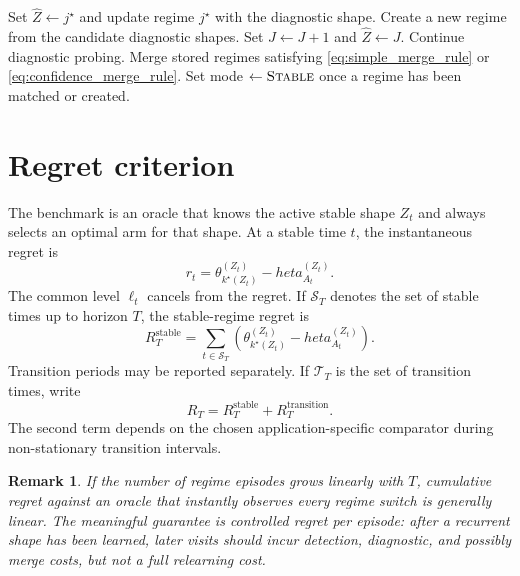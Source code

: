 \documentclass[11pt]{article}
\newtheorem{remark}{Remark}
\newcommand{\Sset}{\mathcal S}
\newcommand{\Tset}{\mathcal T}
\begin{document}
\begin{algorithm}[t]
\begin{algorithmic}[1]
            \State Set $\widehat Z\gets j^\star$ and update regime $j^\star$ with the diagnostic shape.
            \State Create a new regime from the candidate diagnostic shapes.
            \State Set $J\gets J+1$ and $\widehat Z\gets J$.
        \Else
            \State Continue diagnostic probing.
        \EndIf
        \State Merge stored regimes satisfying \eqref{eq:simple_merge_rule} or \eqref{eq:confidence_merge_rule}.
        \State Set mode $\gets\textsc{Stable}$ once a regime has been matched or created.
    \EndIf
\EndFor
\end{algorithmic}
\end{algorithm}

\section{Regret criterion}
\label{sec:regret}

The benchmark is an oracle that knows the active stable shape $Z_t$ and always selects an optimal arm for that shape. At a stable time $t$, the instantaneous regret is
\begin{equation}
\label{eq:instantaneous_regret}
r_t
=
\theta_{k^\star(Z_t)}^{(Z_t)}-	heta_{A_t}^{(Z_t)}.
\end{equation}
The common level $\ell_t$ cancels from the regret. If $\Sset_T$ denotes the set of stable times up to horizon $T$, the stable-regime regret is
\begin{equation}
\label{eq:stable_regret}
R_T^{\mathrm{stable}}
=
\sum_{t\in\Sset_T}
\left(
\theta_{k^\star(Z_t)}^{(Z_t)}-	heta_{A_t}^{(Z_t)}
\right).
\end{equation}
Transition periods may be reported separately. If $\Tset_T$ is the set of transition times, write
\begin{equation}
\label{eq:regret_decomposition}
R_T
=
R_T^{\mathrm{stable}}+R_T^{\mathrm{transition}}.
\end{equation}
The second term depends on the chosen application-specific comparator during non-stationary transition intervals.

\begin{remark}
If the number of regime episodes grows linearly with $T$, cumulative regret against an oracle that instantly observes every regime switch is generally linear. The meaningful guarantee is controlled regret per episode: after a recurrent shape has been learned, later visits should incur detection, diagnostic, and possibly merge costs, but not a full relearning cost.
\end{remark}
\end{document}
